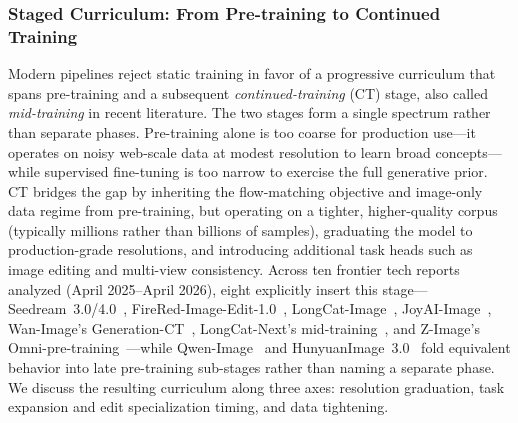 \documentclass{llmxive}
\begin{document}
\subsubsection{Staged Curriculum: From Pre-training to Continued Training}
\label{subsec:curriculum}

{Modern pipelines reject static training in favor of a progressive curriculum that spans pre-training and a subsequent \emph{continued-training} (CT) stage, also called \emph{mid-training} in recent literature. The two stages form a single spectrum rather than separate phases. Pre-training alone is too coarse for production use---it operates on noisy web-scale data at modest resolution to learn broad concepts---while supervised fine-tuning is too narrow to exercise the full generative prior. CT bridges the gap by inheriting the flow-matching objective and image-only data regime from pre-training, but operating on a tighter, higher-quality corpus (typically millions rather than billions of samples), graduating the model to production-grade resolutions, and introducing additional task heads such as image editing and multi-view consistency. Across ten frontier tech reports analyzed (April 2025--April 2026), eight explicitly insert this stage---Seedream~3.0/4.0~\citep{gao2025seedream,seedream2025seedream}, FireRed-Image-Edit-1.0~\citep{team2026firered}, LongCat-Image~\citep{team2025longcat}, JoyAI-Image~\citep{jdjoyaiimage}, Wan-Image's Generation-CT~\citep{mao2026wan}, LongCat-Next's mid-training~\citep{team2026longcat}, and Z-Image's Omni-pre-training~\citep{cai2025z}---while Qwen-Image~\citep{wu2025qwen} and HunyuanImage~3.0~\citep{cao2025hunyuanimage} fold equivalent behavior into late pre-training sub-stages rather than naming a separate phase. We discuss the resulting curriculum along three axes: resolution graduation, task expansion and edit specialization timing, and data tightening.}
\end{document}
